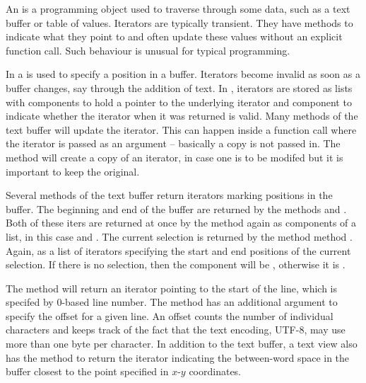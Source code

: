 
An  is a programming object used to traverse through
some data, such as a text buffer or table of values. Iterators are
typically transient. They have
methods to indicate what they point to and often update these
values without an explicit function call. Such behaviour is unusual
for typical \R\/ programming.


In \GTK{} a  is used to specify a position in a
buffer. Iterators become invalid as soon as a buffer changes, say
through the addition of text.  In , iterators are stored as
lists with components  to hold a pointer to the underlying
iterator and component  to indicate whether the iterator
when it was returned is valid. Many methods of the text buffer will
update the iterator. This can happen inside a function call where the
iterator is passed as an argument -- basically a copy is not passed
in. The  method will create a copy of an
iterator, in case one is to be modifed but it is important to keep the original.

Several methods of the text buffer return iterators marking positions
in the buffer.  The beginning and end of the buffer are returned by
the methods  and
. Both of these iters are returned
at once by the method  again as
components of a list, in this case  and .  The
current selection is returned by the method method
. Again, as a list of
iterators specifying the start and end positions of the current
selection. If there is no selection, then the component 
will be , otherwise it is .

The method  will return an
iterator pointing to the start of the line, which is specifed by
$0$-based line number. The method
 has an additional argument
to specify the offset for a given line. An offset counts the number of
individual characters and keeps track of the fact that the text
encoding, UTF-8, may use more than one byte per character.  In
addition to the text buffer, a text view also has the method
 to return the iterator
indicating the between-word space in the buffer closest to the point
specified in $x$-$y$ coordinates.

